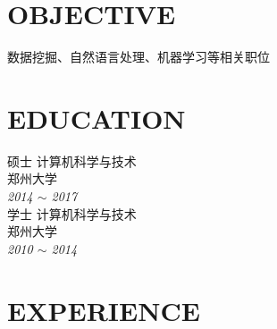 \documentclass[line, margin]{res}
\begin{document}
\address{likun@stu.zzu.edu.cn}
\address{152-2511-1797}

\begin{resume}
\vspace {5pt}
\section{OBJECTIVE}
 { 数据挖掘、自然语言处理、机器学习等相关职位}

\section{EDUCATION} 
 { 硕士 计算机科学与技术  \\
 郑州大学 }\\
 {\sl 2014 $\sim$ 2017} \\
[15pt]
 { 学士 计算机科学与技术 \\
 郑州大学 } \\
 {\sl 2010 $\sim$ 2014 }
 
\section{EXPERIENCE}


\end{resume}
\end{document}
